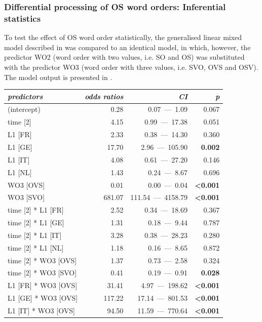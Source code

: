 \subsubsection{Differential processing of OS word orders: Inferential statistics}\label{sec:05:2.5.1}

To test the effect of OS word order statistically, the generalised linear mixed model described in  was compared to an identical model, in which, however, the predictor WO2 (word order with two values, i.e. SO and OS) was substituted with the predictor WO3 (word order with three values, i.e. SVO, OVS and OSV). The model output is presented in .

\begin{table}
    \begin{tabularx}{\textwidth}{Xrrr}
    \lsptoprule
    \textit{predictors} & \textit{odds} \textit{ratios} & \textit{CI} & \textit{p}\\
    \midrule
    (intercept) & 0.28 & 0.07~—~1.09 & 0.067\\
    time [2] & 4.15 & 0.99~—~17.38 & 0.051\\
    L1 [FR] & 2.33 & 0.38~—~14.30 & 0.360\\
    L1 [GE] & 17.70 & 2.96~—~105.90 & \textbf{0.002}\\
    L1 [IT] & 4.08 & 0.61~—~27.20 & 0.146\\
    L1 [NL] & 1.43 & 0.24~—~8.67 & 0.696\\
    WO3 [OVS] & 0.01 & 0.00~—~0.04 & \textbf{<0.001}\\
    WO3 [SVO] & 681.07 & 111.54~—~4158.79 & \textbf{<0.001}\\
    time [2] * L1 [FR] & 2.52 & 0.34~—~18.69 & 0.367\\
    time [2] * L1 [GE] & 1.31 & 0.18~—~9.44 & 0.787\\
    time [2] * L1 [IT] & 3.28 & 0.38~—~28.23 & 0.280\\
    time [2] * L1 [NL] & 1.18 & 0.16~—~8.65 & 0.872\\
    time [2] * WO3 [OVS] & 1.37 & 0.73~—~2.58 & 0.324\\
    time [2] * WO3 [SVO] & 0.41 & 0.19~—~0.91 & \textbf{0.028}\\
    L1 [FR] * WO3 [OVS] & 31.41 & 4.97~—~198.62 & \textbf{<0.001}\\
    L1 [GE] * WO3 [OVS] & 117.22 & 17.14~—~801.53 & \textbf{<0.001}\\
    L1 [IT] * WO3 [OVS] & 94.50 & 11.59~—~770.64 & \textbf{<0.001}\\

\end{tabularx}
\end{table}
